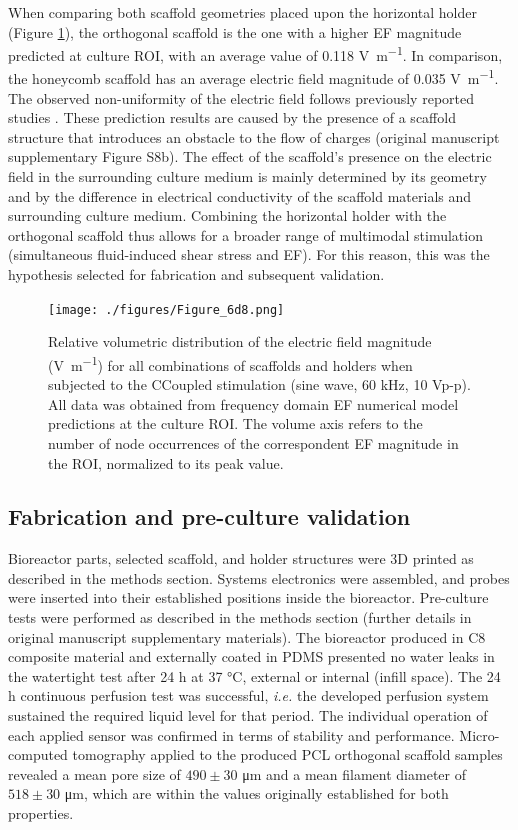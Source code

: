 When comparing both scaffold geometries placed upon the horizontal holder (Figure \ref{figEF}), the orthogonal scaffold is the one with a higher \acs{EF} magnitude predicted at culture \acs{ROI}, with an average value of 0.118 \unit{\volt\per\meter}. In comparison, the honeycomb scaffold has an average electric field magnitude of 0.035 \unit{\volt\per\meter}. The observed non-uniformity of the electric field follows previously reported studies \cite{Meneses2021-nd}. These prediction results are caused by the presence of a scaffold structure that introduces an obstacle to the flow of charges (original manuscript supplementary Figure S8b). The effect of the scaffold's presence on the electric field in the surrounding culture medium is mainly determined by its geometry and by the difference in electrical conductivity of the scaffold materials and surrounding culture medium. Combining the horizontal holder with the orthogonal scaffold thus allows for a broader range of multimodal stimulation (simultaneous fluid-induced shear stress and \acs{EF}). For this reason, this was the hypothesis selected for fabrication and subsequent validation.



\begin{figure}
\centering
\texttt{[image: ./figures/Figure\_6d8.png]}
\caption{Relative volumetric distribution of the electric field magnitude (\unit{\volt\per\meter}) for all combinations of scaffolds and holders when subjected to the \acs{CCoupled} stimulation (sine wave, 60 \unit{\kilo\hertz}, 10 \unit{\volt}p-p). All data was obtained from frequency domain \acs{EF} numerical model predictions at the culture \acs{ROI}. The volume axis refers to the number of node occurrences of the correspondent \acs{EF} magnitude in the \acs{ROI}, normalized to its peak value.}
\label{figEF}
\end{figure}


\subsection{Fabrication and pre-culture validation}
Bioreactor parts, selected scaffold, and holder structures were \acs{3D} printed as described in the methods section. Systems electronics were assembled, and probes were inserted into their established positions inside the bioreactor. Pre-culture tests were performed as described in the methods section (further details in original manuscript supplementary materials). The bioreactor produced in \acs{C8} composite material and externally coated in PDMS presented no water leaks in the watertight test after 24 \si{\hour} at 37 \unit{\celsius}, external or internal (infill space). The 24 \si{\hour} continuous perfusion test was successful, \textit{i.e.} the developed perfusion system sustained the required liquid level for that period. The individual operation of each applied sensor was confirmed in terms of stability and performance. Micro-computed tomography applied to the produced \ac{PCL} orthogonal scaffold samples revealed a mean pore size of $490 \pm 30$ \unit{\micro\meter} and a mean filament diameter of $518 \pm 30$ \unit{\micro\meter}, which are within the values originally established for both properties. 

